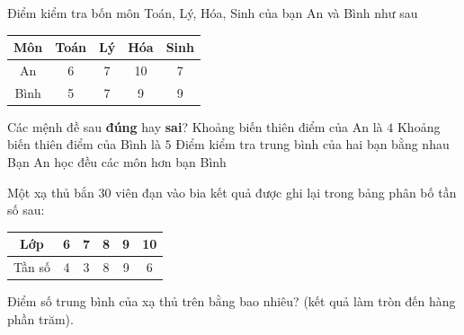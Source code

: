 \begin{ex}%
	Điểm kiểm tra bốn môn Toán, Lý, Hóa, Sinh của bạn An và Bình như sau
	\begin{center}
		\begin{tabular}{|c|c|c|c|c|}
			\hline
			Môn&Toán&Lý&Hóa&Sinh\\
			\hline
			An&6&7&10&7\\
			Bình&5&7&9&9\\
			\hline
		\end{tabular}
	\end{center}
	Các mệnh đề sau \textbf{đúng} hay \textbf{sai}?
	\choiceTF
	{\True Khoảng biến thiên điểm của An là $4$}
	{ Khoảng biến thiên điểm của Bình là $5$}
	{\True Điểm kiểm tra trung bình của hai bạn bằng nhau}
	{\True Bạn An học đều các môn hơn bạn Bình}
\end{ex}

\begin{bt}%
	Một xạ thủ bắn 30 viên đạn vào bia kết quả được ghi lại trong bảng phân bố tần số sau:
	\begin{center}
		\begin{tabular}{|c|c|c|c|c|c|}
			\hline
			Lớp&6&7&8&9&10\\
			\hline
			Tần số&4&3&8&9&6\\
			\hline
		\end{tabular}
	\end{center}
	Điểm số trung bình của xạ thủ trên bằng bao nhiêu? (kết quả làm tròn đến hàng phần trăm).
\end{bt}

